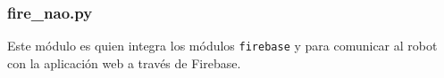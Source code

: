 \subsubsection{fire\_nao.py}
\label{\detokenize{nao_firebase:fire-nao-py}}
Este módulo es quien integra los módulos \texttt{firebase} y  para comunicar al robot
con la aplicación web a través de Firebase.
